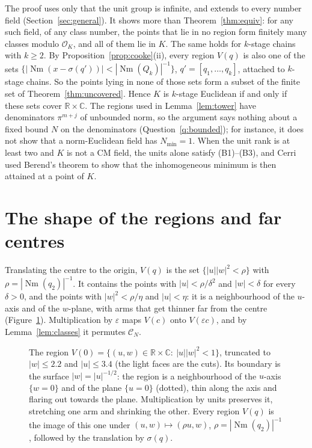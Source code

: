 \documentclass[11pt]{amsart}
\theoremstyle{definition}
\theoremstyle{remark}
\numberwithin{equation}{section}
\newcommand{\R}{\mathbb{R}}
\newcommand{\C}{\mathbb{C}}
\newcommand{\cO}{\mathcal{O}}
\newcommand{\Nm}{\operatorname{Nm}}
\newcommand{\Nmin}{N_{\min}}
\begin{document}
The proof uses only that the unit group is infinite, and extends to every number field
(Section~\ref{sec:general}). It shows more than Theorem~\ref{thm:equiv}: for any such field,
of any class number, the points that lie in no region form finitely many classes modulo
$\cO_K$, and all of them lie in $K$. The same holds for $k$-stage chains with $k\ge2$. By
Proposition~\ref{prop:cooke}(ii), every region $V(q)$ is also one of the sets
$\{|\Nm(x-\sigma(q'))|<|\Nm(Q_k)|^{-1}\}$, $q'=[q_1,\dots,q_k]$, attached to $k$-stage chains.
So the points lying in none of those sets form a subset of the finite set of
Theorem~\ref{thm:uncovered}. Hence $K$ is $k$-stage Euclidean if and only if these sets cover
$\R\times\C$. The regions used in Lemma~\ref{lem:tower} have denominators
$\pi^{m+j}$ of unbounded norm, so the argument says nothing about a fixed bound $N$ on the
denominators (Question~\ref{q:bounded}); for instance, it does not show that a norm-Euclidean
field has $\Nmin=1$. When the unit rank is at least two and $K$ is not a CM field, the units
alone satisfy (B1)--(B3), and Cerri \cite{Ce3} used Berend's theorem to show that the
inhomogeneous minimum is then attained at a point of $K$.

\section{The shape of the regions and far centres}\label{sec:far}

Translating the centre to the origin, $V(q)$ is the set $\{|u||w|^2<\rho\}$ with
$\rho=|\Nm(q_2)|^{-1}$. It contains the points with $|u|<\rho/\delta^2$ and $|w|<\delta$ for
every $\delta>0$, and the points with $|w|^2<\rho/\eta$ and $|u|<\eta$: it is a neighbourhood
of the $u$-axis and of the $w$-plane, with arms that get thinner far from the centre
(Figure~\ref{fig:horn}).
Multiplication by $\varepsilon$ maps $V(c)$ onto $V(\varepsilon c)$, and by
Lemma~\ref{lem:classes} it permutes $\mathcal C_N$.

\begin{figure}[ht]
\centering

\caption{The region $V(0)=\{(u,w)\in\R\times\C:\ |u||w|^2<1\}$, truncated to $|w|\le2.2$ and
$|u|\le3.4$ (the light faces are the cuts). Its boundary is the surface $|w|=|u|^{-1/2}$: the
region is a neighbourhood of the $u$-axis $\{w=0\}$ and of the plane $\{u=0\}$ (dotted), thin
along the axis and flaring out towards the plane. Multiplication by units preserves it,
stretching one arm and shrinking the other. Every region $V(q)$ is the image of this one under
$(u,w)\mapsto(\rho u,w)$, $\rho=|\Nm(q_2)|^{-1}$, followed by the translation by $\sigma(q)$.}
\label{fig:horn}
\end{figure}
\end{document}
